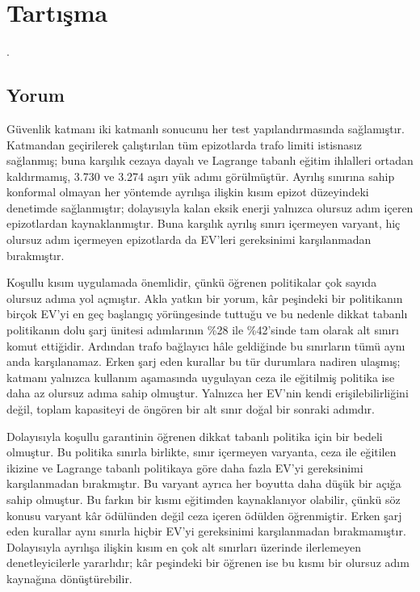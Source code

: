 \section{Tartışma}\label{sec:discussion}

.

\subsection{Yorum}\label{sec:interpretation}

Güvenlik katmanı iki katmanlı sonucunu her test yapılandırmasında sağlamıştır.
Katmandan geçirilerek çalıştırılan tüm epizotlarda trafo limiti istisnasız sağlanmış; buna karşılık cezaya dayalı ve Lagrange tabanlı eğitim ihlalleri ortadan kaldırmamış, 3.730 ve 3.274 aşırı yük adımı görülmüştür.
Ayrılış sınırına sahip konformal olmayan her yöntemde ayrılışa ilişkin kısım epizot düzeyindeki denetimde sağlanmıştır; dolayısıyla kalan eksik enerji yalnızca olursuz adım içeren epizotlardan kaynaklanmıştır.
Buna karşılık ayrılış sınırı içermeyen varyant, hiç olursuz adım içermeyen epizotlarda da EV'leri gereksinimi karşılanmadan bırakmıştır.

Koşullu kısım uygulamada önemlidir, çünkü öğrenen politikalar çok sayıda olursuz adıma yol açmıştır.
Akla yatkın bir yorum, kâr peşindeki bir politikanın birçok EV'yi en geç başlangıç yörüngesinde tuttuğu ve bu nedenle dikkat tabanlı politikanın dolu şarj ünitesi adımlarının \%28 ile \%42'sinde tam olarak alt sınırı komut ettiğidir.
Ardından trafo bağlayıcı hâle geldiğinde bu sınırların tümü aynı anda karşılanamaz.
Erken şarj eden kurallar bu tür durumlara nadiren ulaşmış; katmanı yalnızca kullanım aşamasında uygulayan ceza ile eğitilmiş politika ise daha az olursuz adıma sahip olmuştur.
Yalnızca her EV'nin kendi erişilebilirliğini değil, toplam kapasiteyi de öngören bir alt sınır doğal bir sonraki adımdır.

Dolayısıyla koşullu garantinin öğrenen dikkat tabanlı politika için bir bedeli olmuştur.
Bu politika sınırla birlikte, sınır içermeyen varyanta, ceza ile eğitilen ikizine ve Lagrange tabanlı politikaya göre daha fazla EV'yi gereksinimi karşılanmadan bırakmıştır.
Bu varyant ayrıca her boyutta daha düşük bir açığa sahip olmuştur.
Bu farkın bir kısmı eğitimden kaynaklanıyor olabilir, çünkü söz konusu varyant kâr ödülünden değil ceza içeren ödülden öğrenmiştir.
Erken şarj eden kurallar aynı sınırla hiçbir EV'yi gereksinimi karşılanmadan bırakmamıştır.
Dolayısıyla ayrılışa ilişkin kısım en çok alt sınırları üzerinde ilerlemeyen denetleyicilerle yararlıdır; kâr peşindeki bir öğrenen ise bu kısmı bir olursuz adım kaynağına dönüştürebilir.

